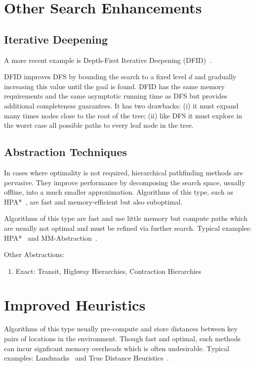 \section{Other Search Enhancements}
\label{cha::lit::enhancements}

\subsection{Iterative Deepening}
\label{cha::lit::enhancements::deepening}
A more recent example is Depth-First Iterative Deepening (DFID)~\citep{korf85}.

DFID improves DFS by bounding the search to a fixed level $d$ and gradually
increasing this value until the goal is found. DFID has the same memory
requirements and the same asymptotic running time as DFS but provides additional
completeness guarantees. It has two drawbacks: (i) it must expand many times
nodes close to the root of the tree; (ii) like DFS it must explore in the worst
case all possible paths to every leaf node in the tree.

\subsection{Abstraction Techniques}
\label{cha::lit::enhancements::abstraction}
In cases where optimality is not required, hierarchical pathfinding methods
are pervasive.  They improve performance by decomposing the
search space, usually offline, into a much smaller approximation.  Algorithms
of this type, such as HPA*~\cite{botea04}, are  fast and
memory-efficient but also suboptimal.

Algorithms of this type are fast and use little memory but compute paths which are usually not
optimal and must be refined via further search. Typical examples: HPA*~\cite{botea04} and
MM-Abstraction~\cite{sturtevant07}.

Other Abstractions:
\begin{enumerate}
\item{Exact: Transit, Highway Hierarchies, Contraction Hierarchies}
\end{enumerate}

\section{Improved Heuristics}
\label{cha::lit::enhancements::heuristics}
Algorithms of this type usually pre-compute and store distances between key pairs of locations
in the environment. Though fast and optimal, such methods can incur signficant
memory overheads which is often undesirable. Typical examples: Landmarks~\cite{goldberg05} and
True Distance Heuristics~\cite{sturtevant09}.

